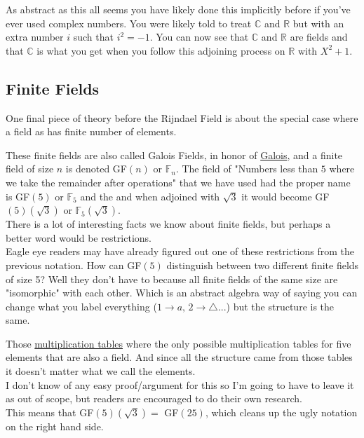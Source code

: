 As abstract as this all seems you have likely done this implicitly before if you've ever used complex numbers.
You were likely told to treat $\mathbb{C}$ and $\mathbb{R}$ but with an extra number $i$ such that $i^2=-1$.
You can now see that $\mathbb{C}$ and $\mathbb{R}$ are fields and that $\mathbb{C}$ is what you get when you follow this adjoining process on $\mathbb{R}$ with $X^2+1$.

\subsection{Finite Fields}
One final piece of theory before the Rijndael Field is about the special case where a field as has finite number of elements.

These finite fields are also called Galois Fields, in honor of \hyperref[intro:galois]{Galois}, and a finite field of size $n$ is denoted GF$(n)$ or $\mathbb{F}_n$.
The field of "Numbers less than $5$ where we take the remainder after operations" that we have used had the proper name is GF$(5)$ or $\mathbb{F}_5$ and the and when adjoined with $\sqrt{3}$ it would become GF$(5)(\sqrt{3})$ or $\mathbb{F}_5(\sqrt{3})$.
\\

There is a lot of interesting facts we know about finite fields, but perhaps a better word would be restrictions.
\\

Eagle eye readers may have already figured out one of these restrictions from the previous notation.
How can GF$(5)$ distinguish between two different finite fields of size 5?
Well they don't have to because all finite fields of the same size are "isomorphic" with each other. 
Which is an abstract algebra way of saying you can change what you label everything ($1\rightarrow a,\, 2\rightarrow \triangle$...) but the structure is the same.

Those \hyperref[intro:gf5]{multiplication tables} where the only possible multiplication tables for five elements that are also a field.
And since all the structure came from those tables it doesn't matter what we call the elements.
\\

I don't know of any easy proof/argument for this so I'm going to have to leave it as out of scope,
but readers are encouraged to do their own research.
\\

This means that GF$(5)(\sqrt{3}) = $ GF$(25)$, which cleans up the ugly notation on the right hand side.
\\

